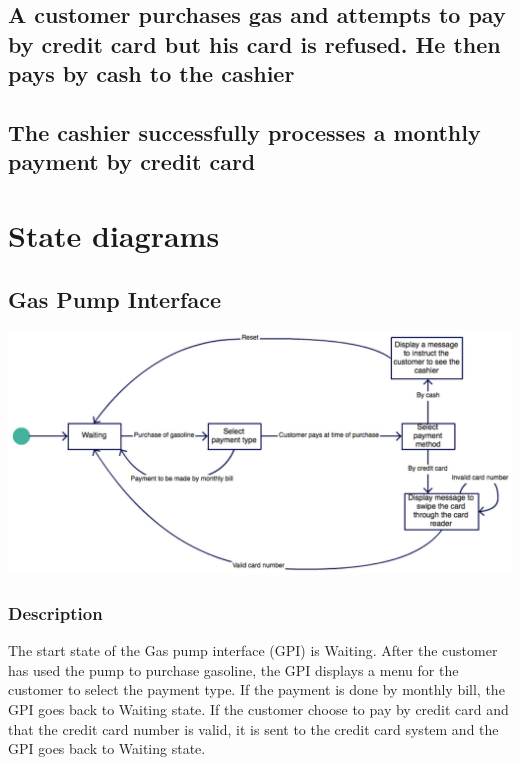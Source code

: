 \documentclass[11pt, a4paper]{article}
\newcommand{\state}[1]{\textsf{#1}}
\begin{document}
\subsection{A customer purchases gas and attempts to pay by credit card but his card is refused. He then pays by cash to the cashier}


\subsection{The cashier successfully processes a monthly payment by credit card}



\newpage
\section{State diagrams}

\subsection{Gas Pump Interface}

\begin{center}
\includegraphics[width=\textwidth]{GasPumpInterface_diagram.pdf}
\end{center}


\subsubsection*{Description}

The start state of the Gas pump interface (GPI) is \state{Waiting}.
After the customer has used the pump to purchase gasoline, the GPI displays a menu for the customer to select the payment type.
If the payment is done by monthly bill, the GPI goes back to \state{Waiting} state.
If the customer choose to pay by credit card and that the credit card number is valid, it is sent to the credit card system and the GPI goes back to \state{Waiting} state.
\end{document}
